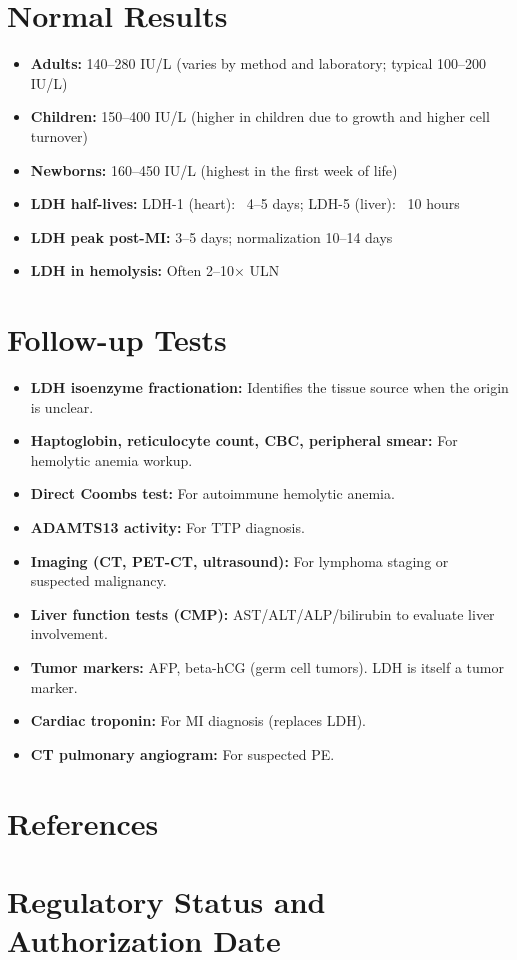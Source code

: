 \section*{Normal Results}
\begin{itemize}
  \item \textbf{Adults:} 140--280 IU/L (varies by method and laboratory; typical 100--200 IU/L) \cite{wallach2022interpretation}
  \item \textbf{Children:} 150--400 IU/L (higher in children due to growth and higher cell turnover)
  \item \textbf{Newborns:} 160--450 IU/L (highest in the first week of life)
  \item \textbf{LDH half-lives:} LDH-1 (heart): ~4--5 days; LDH-5 (liver): ~10 hours
  \item \textbf{LDH peak post-MI:} 3--5 days; normalization 10--14 days
  \item \textbf{LDH in hemolysis:} Often 2--10$\times$ ULN
\end{itemize}

\section*{Follow-up Tests}
\begin{itemize}
  \item \textbf{LDH isoenzyme fractionation:} Identifies the tissue source when the origin is unclear.
  \item \textbf{Haptoglobin, reticulocyte count, CBC, peripheral smear:} For hemolytic anemia workup.
  \item \textbf{Direct Coombs test:} For autoimmune hemolytic anemia.
  \item \textbf{ADAMTS13 activity:} For TTP diagnosis.
  \item \textbf{Imaging (CT, PET-CT, ultrasound):} For lymphoma staging or suspected malignancy.
  \item \textbf{Liver function tests (CMP):} AST/ALT/ALP/bilirubin to evaluate liver involvement.
  \item \textbf{Tumor markers:} AFP, beta-hCG (germ cell tumors). LDH is itself a tumor marker.
  \item \textbf{Cardiac troponin:} For MI diagnosis (replaces LDH).
  \item \textbf{CT pulmonary angiogram:} For suspected PE.
\end{itemize}

\section*{References}



\clearpage
\section*{Regulatory Status and Authorization Date}

\clearpage
